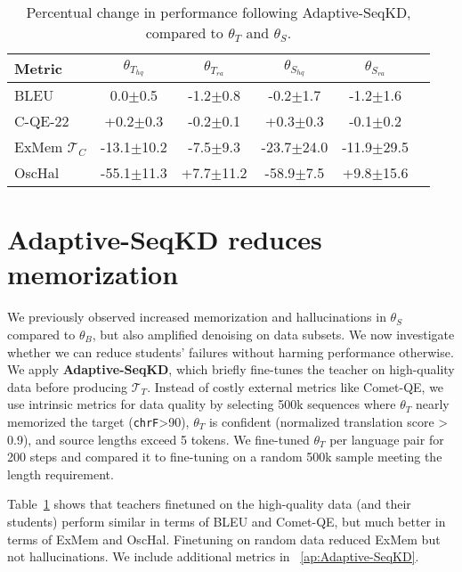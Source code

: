 \begin{table}[t]
    \centering\small \setlength{\tabcolsep}{4.5pt}
    \begin{tabular}{lccccc}
    \toprule
    \textbf{Metric} & $\theta_{T_{hq}}$ & $\theta_{T_{ra}}$ & $\theta_{S_{hq}}$ & $\theta_{S_{ra}}$ \\ \midrule\midrule
    BLEU                 & 0.0{\tiny$\pm$0.5}    & -1.2{\tiny$\pm$0.8}  & -0.2{\tiny$\pm$1.7}   & -1.2{\tiny$\pm$1.6}   \\
    C-QE-22              & +0.2{\tiny$\pm$0.3}   & -0.2{\tiny$\pm$0.1}  & +0.3{\tiny$\pm$0.3}   & -0.1{\tiny$\pm$0.2}   \\
    ExMem $\mathcal{T}_C$& -13.1{\tiny$\pm$10.2} & -7.5{\tiny$\pm$9.3}  & -23.7{\tiny$\pm$24.0} & -11.9{\tiny$\pm$29.5} \\
    OscHal               & -55.1{\tiny$\pm$11.3} & +7.7{\tiny$\pm$11.2} & -58.9{\tiny$\pm$7.5}  & +9.8{\tiny$\pm$15.6}  \\\bottomrule 
    \end{tabular}
    \caption{Percentual change in performance following Adaptive-SeqKD, compared to $\theta_T$ and $\theta_S$.}
    \label{tab:Adaptive-SeqKD}
    \vspace{-0.2cm}
\end{table}


\section{Adaptive-SeqKD reduces memorization}
\label{sec:Adaptive-SeqKD}
We previously observed increased memorization and hallucinations in $\theta_S$ compared to $\theta_B$, but also amplified denoising on data subsets.
We now investigate whether we can reduce students' failures without harming performance otherwise. 
We apply \textbf{Adaptive-SeqKD}, which briefly fine-tunes the teacher on high-quality data before producing $\mathcal{T}_T$. Instead of costly external metrics like Comet-QE, we use intrinsic metrics for data quality by selecting 500k sequences where $\theta_T$ nearly memorized the target (\texttt{chrF}>90), $\theta_T$ is confident (normalized translation score > 0.9), and source lengths exceed 5 tokens.
We fine-tuned $\theta_T$ per language pair for 200 steps and compared it to fine-tuning on a random 500k sample meeting the length requirement.

Table~\ref{tab:Adaptive-SeqKD} shows that teachers finetuned on the high-quality data (and their students) perform similar in terms of BLEU and Comet-QE, but much better in terms of ExMem and OscHal.
Finetuning on random data reduced ExMem but not hallucinations.
We include additional metrics in \appendixshortcut~\ref{ap:Adaptive-SeqKD}.
